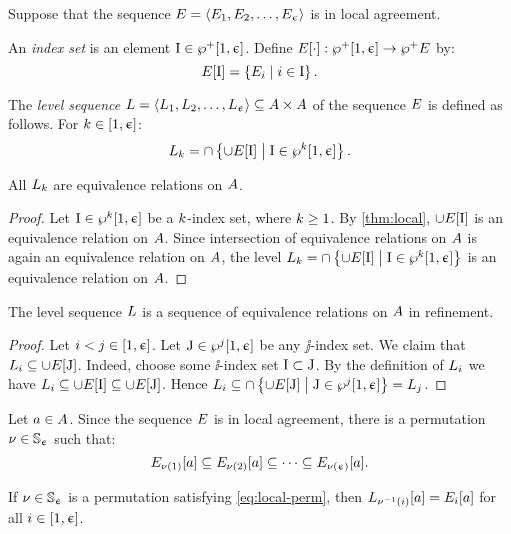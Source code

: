 Suppose that the sequence
$E = \left\langle E_{1}, E_{2}, \dots, E_{\upepsilon} \right\rangle$ is in local agreement.
\begin{definition}
An \emph{index set} is an element $\mathrm{I} \in \wp^{+}{[}1, \upepsilon]$.
Define $E[\cdot] : \wp^{+}{[}1, \upepsilon] \to \wp^{+}{E}$ by:
\[
  E[\mathrm{I}] = \left\{E_{i}\mathrel{}\middle|\mathrel{}i \in \mathrm{I}\right\}.
\]

The \emph{level sequence} $L = \left\langle L_{1},L_{2},\dots,L_{\upepsilon} \right\rangle
\subseteq {A\times A}$ of the sequence $E$ is defined as follows.
For $k \in [1, \upepsilon]$:
\[
  L_{k} = \cap \left\{\cup E[\mathrm{I}]\mathrel{}\middle|\mathrel{}\mathrm{I} \in \wp^{k}{[}1, \upepsilon]\right\}.
\]
\end{definition}
\begin{remark}
All $L_{k}$ are equivalence relations on $A$.
\end{remark}
\begin{proof}
Let $\mathrm{I} \in \wp^{k}{[}1,\upepsilon]$ be a $k$-index set, where $k \geq 1$.
By \cref{thm:local}, $\cup E[\mathrm{I}]$ is an equivalence relation on
$A$.
Since intersection of equivalence relations on $A$ is again an equivalence 
relation on $A$, the level
$L_{k} = \cap \left\{\cup E[\mathrm{I}]\mathrel{}\middle|\mathrel{}\mathrm{I} \in \wp^{k}{[}1,\upepsilon]\right\}$
is an equivalence relation on $A$.
\end{proof}
\begin{remark}\label{rem:local-lvl-refine}
The level sequence $L$ is a sequence of equivalence relations on $A$ in
refinement.
\end{remark}
\begin{proof}
Let $i < j \in [1, \upepsilon]$.
Let $\mathrm{J} \in \wp^{j}{[}1, \upepsilon]$ be any $\jj$-index set.
We claim that $L_{i} \subseteq \cup E[\mathrm{J}]$.
Indeed, choose some $\ii$-index set $\mathrm{I} \subset \mathrm{J}$.
By the definition of $L_{i}$ we have
$L_{i} \subseteq \cup E[\mathrm{I}] \subseteq \cup E[\mathrm{J}]$.
Hence
$L_{i} \subseteq \cap \left\{\cup E[\mathrm{J}]\mathrel{}\middle|\mathrel{}\mathrm{J} \in \wp^{j}{[}1,\upepsilon]\right\}
= L_{j}$.
\end{proof}
Let $a \in A$. Since the sequence $E$ is in local agreement, there is
a permutation $\nu \in \mathbb{S}_{\upepsilon}$ such that:
\begin{equation}\label{eq:local-perm}
  E_{\nu(1)}[a] \subseteq
  E_{\nu(2)}[a] \subseteq
  \dots \subseteq
  E_{\nu(\upepsilon)}[a].
\end{equation}
\begin{lemma}\label{lem:local-lvl-perm}
If $\nu \in \mathbb{S}_{\upepsilon}$ is a permutation satisfying \cref{eq:local-perm},
then $L_{\nu^{-1}(i)}[a] = E_{i}[a]$ for all $i \in [1,\upepsilon]$.
\end{lemma}
